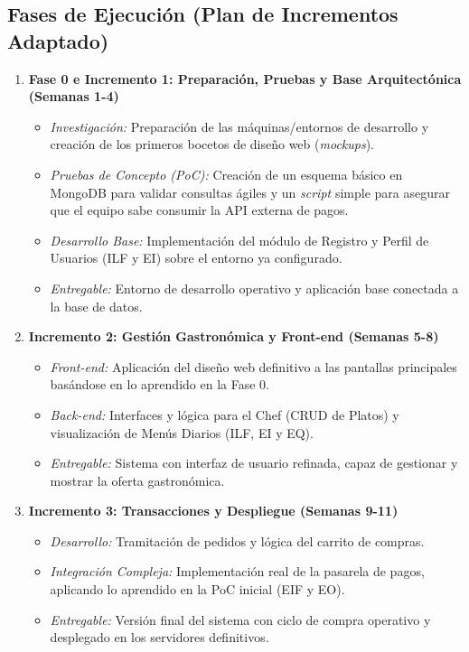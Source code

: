 \documentclass[12pt,a4paper]{article}
\begin{document}
\subsection{Fases de Ejecución (Plan de Incrementos Adaptado)}
\begin{enumerate}
    \item \textbf{Fase 0 e Incremento 1: Preparación, Pruebas y Base Arquitectónica (Semanas 1-4)}
    \begin{itemize}
        \item \textit{Investigación:} Preparación de las máquinas/entornos de desarrollo y creación de los primeros bocetos de diseño web (\textit{mockups}).
        \item \textit{Pruebas de Concepto (PoC):} Creación de un esquema básico en MongoDB para validar consultas ágiles y un \textit{script} simple para asegurar que el equipo sabe consumir la API externa de pagos.
        \item \textit{Desarrollo Base:} Implementación del módulo de Registro y Perfil de Usuarios (ILF y EI) sobre el entorno ya configurado.
        \item \textit{Entregable:} Entorno de desarrollo operativo y aplicación base conectada a la base de datos.
    \end{itemize}
    \item \textbf{Incremento 2: Gestión Gastronómica y Front-end (Semanas 5-8)}
    \begin{itemize}
        \item \textit{Front-end:} Aplicación del diseño web definitivo a las pantallas principales basándose en lo aprendido en la Fase 0.
        \item \textit{Back-end:} Interfaces y lógica para el Chef (CRUD de Platos) y visualización de Menús Diarios (ILF, EI y EQ).
        \item \textit{Entregable:} Sistema con interfaz de usuario refinada, capaz de gestionar y mostrar la oferta gastronómica.
    \end{itemize}
    \item \textbf{Incremento 3: Transacciones y Despliegue (Semanas 9-11)}
    \begin{itemize}
        \item \textit{Desarrollo:} Tramitación de pedidos y lógica del carrito de compras.
        \item \textit{Integración Compleja:} Implementación real de la pasarela de pagos, aplicando lo aprendido en la PoC inicial (EIF y EO).
        \item \textit{Entregable:} Versión final del sistema con ciclo de compra operativo y desplegado en los servidores definitivos.
    \end{itemize}
\end{enumerate}
\end{document}

